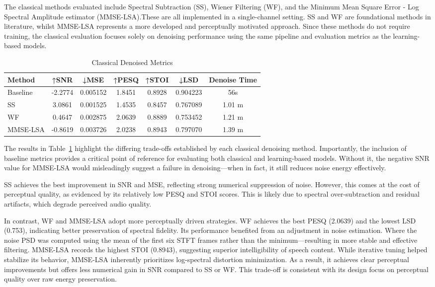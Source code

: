 The classical methods evaluated include Spectral Subtraction (SS), Wiener Filtering (WF), and the Minimum Mean Square Error - Log Spectral Amplitude estimator (MMSE-LSA).These are all implemented in a single-channel setting. SS and WF are foundational methods in literature, whilst MMSE-LSA represents a more developed and perceptually motivated approach. Since these methods do not require training, the classical evaluation focuses solely on denoising performance using the same pipeline and evaluation metrics as the learning-based models.

\vspace{1em}
\begin{table}[H]
\centering
\caption{Classical Denoised Metrics}
\label{tab:classical_metrics}
\begin{tabular}{|l|c|c|c|c|c|c|}
\hline
\textbf{Method} & \textbf{↑SNR} & \textbf{↓MSE} & \textbf{↑PESQ} & \textbf{↑STOI} & \textbf{↓LSD} & \textbf{Denoise Time} \\
\hline
Baseline     & -2.2774 & 0.005152 & 1.8451 & 0.8928 & 0.904223 & 56s \\
SS          & 3.0861 & 0.001525 & 1.4535 & 0.8457 & 0.767089 & 1.01 m \\
WF          & 0.4647 & 0.002875 & 2.0639 & 0.8889 & 0.753452 & 1.21 m \\
MMSE-LSA    & -0.8619 & 0.003726 & 2.0238 & 0.8943 & 0.797070 & 1.39 m \\
\hline
\end{tabular}
\end{table}

The results in Table~\ref{tab:classical_metrics} highlight the differing trade-offs established by each classical denoising method. Importantly, the inclusion of baseline metrics provides a critical point of reference for evaluating both classical and learning-based models. Without it, the negative SNR value for MMSE-LSA would misleadingly suggest a failure in denoising—when in fact, it still reduces noise energy effectively.

SS achieves the best improvement in SNR and MSE, reflecting strong numerical suppression of noise. However, this comes at the cost of perceptual quality, as evidenced by its relatively low PESQ and STOI scores. This is likely due to spectral over-subtraction and residual artifacts, which degrade perceived audio quality.

In contrast, WF and MMSE-LSA adopt more perceptually driven strategies. WF achieves the best PESQ (2.0639) and the lowest LSD (0.753), indicating better preservation of spectral fidelity. Its performance benefited from an adjustment in noise estimation. Where the noise PSD was computed using the mean of the first six STFT frames rather than the minimum—resulting in more stable and effective filtering. MMSE-LSA records the highest STOI (0.8943), suggesting superior intelligibility of speech content. While iterative tuning helped stabilize its behavior, MMSE-LSA inherently prioritizes log-spectral distortion minimization. As a result, it achieves clear perceptual improvements but offers less numerical gain in SNR compared to SS or WF. This trade-off is consistent with its design focus on perceptual quality over raw energy preservation.

